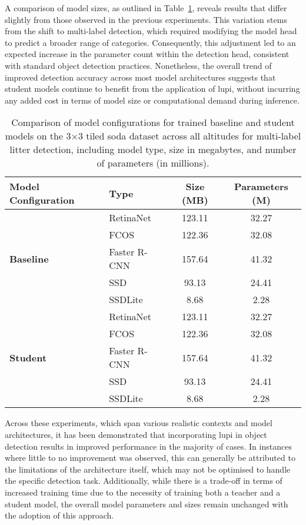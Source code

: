 A comparison of model sizes, as outlined in Table~\ref{tab:model_configs_soda_tiled_multi}, reveals results that differ slightly from those observed in the previous experiments. This variation stems from the shift to multi-label detection, which required modifying the model head to predict a broader range of categories. Consequently, this adjustment led to an expected increase in the parameter count within the detection head, consistent with standard object detection practices. Nonetheless, the overall trend of improved detection accuracy across most model architectures suggests that student models continue to benefit from the application of \gls{lupi}, without incurring any added cost in terms of model size or computational demand during inference.

\begin{table}[!ht]
    \centering
    \begin{tabular}{llcc}
        \toprule
        \textbf{Model Configuration} & \textbf{Type} & \textbf{Size (MB)} & \textbf{Parameters (M)} \\
        \midrule
        \multirow{5}{*}{\textbf{Baseline}} 
            & RetinaNet     & 123.11 & 32.27 \\
            & FCOS          & 122.36 & 32.08 \\
            & Faster R-CNN  & 157.64 & 41.32 \\
            & SSD           & 93.13  & 24.41 \\
            & SSDLite       & 8.68   & 2.28 \\
        \midrule
        \multirow{5}{*}{\textbf{Student}} 
            & RetinaNet     & 123.11 & 32.27 \\
            & FCOS          & 122.36 & 32.08 \\
            & Faster R-CNN  & 157.64 & 41.32 \\
            & SSD           & 93.13  & 24.41 \\
            & SSDLite       & 8.68   & 2.28 \\
        \bottomrule
    \end{tabular}
    \caption{Comparison of model configurations for trained baseline and student models on the 3$\times$3 tiled \gls{soda} dataset across all altitudes for multi-label litter detection, including model type, size in megabytes, and number of parameters (in millions).}
    \label{tab:model_configs_soda_tiled_multi}
\end{table}

Across these experiments, which span various realistic contexts and model architectures, it has been demonstrated that incorporating \gls{lupi} in object detection results in improved performance in the majority of cases. In instances where little to no improvement was observed, this can generally be attributed to the limitations of the architecture itself, which may not be optimised to handle the specific detection task. Additionally, while there is a trade-off in terms of increased training time due to the necessity of training both a teacher and a student model, the overall model parameters and sizes remain unchanged with the adoption of this approach.

